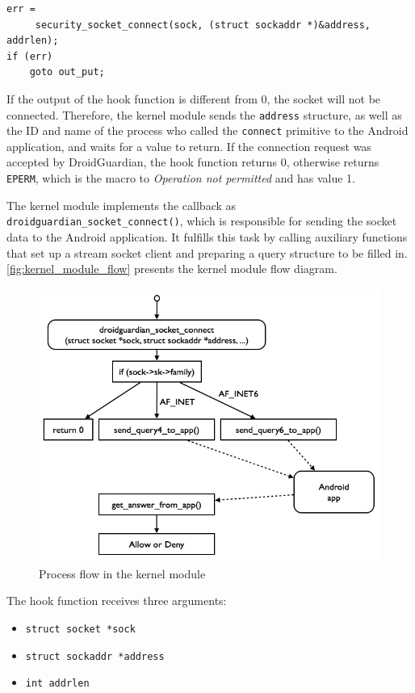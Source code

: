 \begin{lstlisting}[caption=Code snippet of the \texttt{security\_socket\_connect} hook function(Linux kernel v3.11)]
err =
	 security_socket_connect(sock, (struct sockaddr *)&address, addrlen);
if (err)
	goto out_put;
\end{lstlisting}

If the output of the hook function is different from 0, the socket will not be connected. Therefore, the kernel module sends the \texttt{address} structure, as well as the ID and name of the process who called the \texttt{connect} primitive to the Android application, and waits for a value to return. If the connection request was accepted by DroidGuardian, the hook function returns 0, otherwise returns \texttt{EPERM}, which is the macro to \textit{Operation not permitted} and has value 1.

The kernel module implements the callback as \texttt{droidguardian\_socket\_connect()}, which is responsible for sending the socket data to the Android application. It fulfills this task by calling auxiliary functions that set up a stream socket client and preparing a query structure to be filled in. \autoref{fig:kernel_module_flow} presents the kernel module flow diagram.

\begin{figure}[h]
 \centering
 \includegraphics[scale=0.5]{figures/kernel_module_flow.png}
 \caption{Process flow in the kernel module}
 \label{fig:kernel_module_flow}
\end{figure}

The hook function receives three arguments:
\begin{itemize}
\item \texttt{struct socket *sock}
\item \texttt{struct sockaddr *address}
\item \texttt{int addrlen}
\end{itemize}

